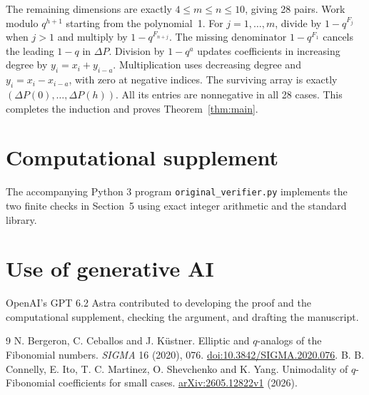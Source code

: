 \documentclass[11pt]{article}
\newcommand{\dd}{\Delta}
\begin{document}
The remaining dimensions are exactly \(4\le m\le n\le10\), giving
28 pairs. Work modulo \(q^{h+1}\) starting from the polynomial~1.
For \(j=1,\ldots,m\), divide by \(1-q^{F_j}\) when \(j>1\)
and multiply by \(1-q^{F_{n+j}}\). The missing denominator
\(1-q^{F_1}\) cancels the leading \(1-q\) in \(\dd P\).
Division by \(1-q^a\) updates coefficients in increasing degree
by \(y_i=x_i+y_{i-a}\). Multiplication uses decreasing degree and
\(y_i=x_i-x_{i-a}\), with zero at negative indices. The surviving
array is exactly \((\dd P(0),\ldots,\dd P(h))\). All its entries
are nonnegative in all 28 cases. This completes the induction and
proves Theorem~\ref{thm:main}.

\section*{Computational supplement}
The accompanying Python 3 program \texttt{original\_verifier.py}
implements the two finite checks in Section~5 using exact integer
arithmetic and the standard library.

\section*{Use of generative AI}
OpenAI's GPT 6.2 Astra contributed to developing the proof and the
computational supplement, checking the argument, and drafting the
manuscript.

\begin{thebibliography}{9}
 N. Bergeron, C. Ceballos and J. K\"ustner.
Elliptic and \(q\)-analogs of the Fibonomial numbers.
\emph{SIGMA} 16 (2020), 076.
\href{https://doi.org/10.3842/SIGMA.2020.076}{doi:10.3842/SIGMA.2020.076}.
 B. B. Connelly, E. Ito, T. C. Martinez, O. Shevchenko
and K. Yang. Unimodality of \(q\)-Fibonomial coefficients for small cases.
\href{https://arxiv.org/abs/2605.12822v1}{arXiv:2605.12822v1} (2026).
\end{thebibliography}
\end{document}
